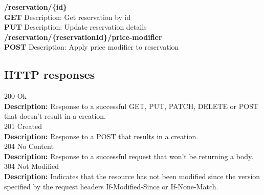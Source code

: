 \documentclass[11pt,a4paper,pdftex]{article}
\begin{document}
\hspace*{1em}\textbf{/reservation/\{\textbf{id}\}}\\
\hspace*{2em}\textbf{GET} Description: Get reservation by id\\
\hspace*{2em}\textbf{PUT} Description: Update reservation details\\

\hspace*{1em}\textbf{/reservation/\{\textbf{reservationId}\}/price-modifier}\\
\hspace*{2em}\textbf{POST} Description: Apply price modifier to reservation\\




\subsection{HTTP responses}
\hspace*{1em}200 Ok\\
\hspace*{2em}\textbf{Description:} Response to a successful GET, PUT, PATCH, DELETE or POST that doesn't result in a creation.\\
\hspace*{1em}201 Created\\
\hspace*{2em}\textbf{Description:} Response to a POST that results in a creation.\\
\hspace*{1em}204 No Content\\
\hspace*{2em}\textbf{Description:} Response to a successful request that won't be returning a body.\\
\hspace*{1em}304 Not Modified\\
\hspace*{2em}\textbf{Description:} Indicates that the resource has not been modified since the version specified by the request headers If-Modified-Since or If-None-Match.
\end{document}
